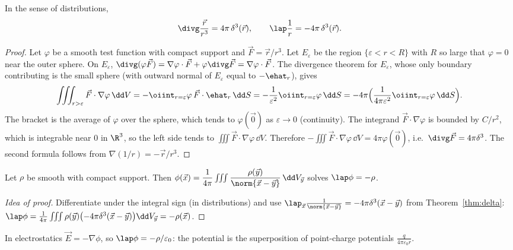 \begin{theorem}\label{thm:delta}
In the sense of distributions,
\[
\divg\frac{\vec r}{r^3}=4\pi\,\delta^3(\vec r),\qquad\lap\frac1r=-4\pi\,\delta^3(\vec r).
\]
\end{theorem}

\begin{proof}
Let $\varphi$ be a smooth test function with compact support and $\vec F=\vec r/r^3$. Let $E_\varepsilon$ be the region $\{\varepsilon<r<R\}$ with $R$ so large that $\varphi=0$ near the outer sphere. On $E_\varepsilon$, $\divg(\varphi\vec F)=\nabla\varphi\cdot\vec F+\varphi\divg\vec F=\nabla\varphi\cdot\vec F$. The divergence theorem for $E_\varepsilon$, whose only boundary contributing is the small sphere (with outward normal of $E_\varepsilon$ equal to $-\ehat_r$), gives
\[
\iiint_{r>\varepsilon}\vec F\cdot\nabla\varphi\,\dd V=-\oiint_{r=\varepsilon}\varphi\,\vec F\cdot\ehat_r\,\dd S=-\frac1{\varepsilon^2}\oiint_{r=\varepsilon}\varphi\,\dd S=-4\pi\Bigl(\frac1{4\pi\varepsilon^2}\oiint_{r=\varepsilon}\varphi\,\dd S\Bigr).
\]
The bracket is the average of $\varphi$ over the sphere, which tends to $\varphi(\vec0)$ as $\varepsilon\to0$ (continuity). The integrand $\vec F\cdot\nabla\varphi$ is bounded by $C/r^2$, which is integrable near $0$ in $\R^3$, so the left side tends to $\iiint\vec F\cdot\nabla\varphi\,\dd V$. Therefore $-\iiint\vec F\cdot\nabla\varphi\,\dd V=4\pi\varphi(\vec0)$, i.e.\ $\divg\vec F=4\pi\delta^3$. The second formula follows from $\nabla(1/r)=-\vec r/r^3$.
\end{proof}

\begin{theorem}\label{thm:poisson}
Let $\rho$ be smooth with compact support. Then $\phi(\vec x)=\dfrac1{4\pi}\iiint\dfrac{\rho(\vec y)}{\norm{\vec x-\vec y}}\,\dd V_{\vec y}$ solves $\lap\phi=-\rho$.
\end{theorem}

\begin{proof}[Idea of proof]
Differentiate under the integral sign (in distributions) and use $\lap_{\vec x}\frac1{\norm{\vec x-\vec y}}=-4\pi\delta^3(\vec x-\vec y)$ from Theorem~\ref{thm:delta}:
$\lap\phi=\frac1{4\pi}\iiint\rho(\vec y)\bigl(-4\pi\delta^3(\vec x-\vec y)\bigr)\dd V_{\vec y}=-\rho(\vec x)$.
\end{proof}

In electrostatics $\vec E=-\nabla\phi$, so $\lap\phi=-\rho/\varepsilon_0$: the potential is the superposition of point-charge potentials $\frac{q}{4\pi\varepsilon_0r}$.

